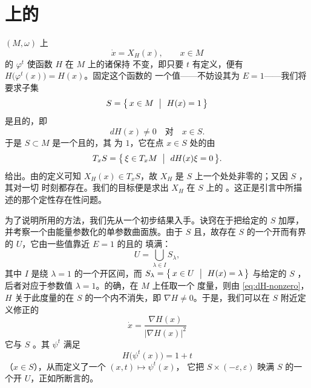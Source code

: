 
\section{\trEnergySurface{}上的\trPeriodicSolution}
\label{sec:energy-periodic-solutions}

$(M,\omega)$ 上\trHamiltonianVectorField%
\begin{equation}\label{eq:XH-xM}
\dot{x}=X_{H}(x),\qquad x\in M
\end{equation}
的\trFlow{} $\varphi^{t}$ 使\trSmooth{}函数 $H$ 在 $M$ 上的诸\trLevelSet{}保持%
不变，即只要 $t$ 有定义，便有 $H\bigl(\varphi^{t}(x)\bigr)=H(x)$。固定这个\trEnergy{}函数的%
一个值——不妨设其为 $E=1$——我们将要求子集
\begin{equation}\label{eq:S-level-one}
S=\bigl\{\,x\in M\ \bigm|\ H(x)=1\,\bigr\}
\end{equation}
是\trCompact{}且\trRegular{}的，即
\begin{equation}\label{eq:dH-nonzero}
dH(x)\neq0\quad\text{对}\quad x\in S.
\end{equation}
于是 $S\subset M$ 是一个\trSmooth{}且\trCompact{}的\trSubmanifold，其%
\trCodimension{}为 $1$，它在点 $x\in S$ 处的\trTangentSpace{}由
\begin{equation}\label{eq:tangent-space-S}
T_{x}S=\bigl\{\,\xi\in T_{x}M\ \bigm|\ dH(x)\xi=0\,\bigr\}.
\end{equation}
给出。由\trHamiltonianVectorField{}的定义可知 $X_{H}(x)\in T_{x}S$，故 $X_{H}$%
是 $S$ 上一个处处非零的\trVectorField；又因 $S$ \trCompact，其\trFlow{}对一切%
时刻都存在。我们的目标便是求出 $X_{H}$ 在\trEnergySurface{} $S$ 上的%
\trPeriodicSolution。这正是引言中所描述的那个定性存在性问题。

为了说明所用的方法，我们先从一个初步结果入手。诀窍在于把给定的%
\trEnergySurface{} $S$ 加厚，并考察一个由能量参数化的单参数曲面族。由于%
$S$ \trCompact{}且\trRegular，故存在 $S$ 的一个开而有界的\trNeighborhood{}%
$U$，它由一些\trEnergy{}值靠近 $E=1$ 的\trCompact{}且\trRegular{}的%
\trEnergySurface{}填满：
\begin{equation}\label{eq:U-union}
U=\bigcup_{\lambda\in I}S_{\lambda},
\end{equation}
其中 $I$ 是绕 $\lambda=1$ 的一个开区间，而%
$S_{\lambda}=\bigl\{\,x\in U\ \bigm|\ H(x)=\lambda\,\bigr\}$ 与给定的\trSurface{}%
$S$ \trDiffeomorphic，后者对应于参数值 $\lambda=1$。的确，在 $M$ 上任取一个%
\trRiemann{}度量，则由 \eqref{eq:dH-nonzero}，%
$H$ 关于此度量的\trGradient{}在 $S$ 的一个\trNeighborhood{}内不消失，即%
$\nabla H\neq0$。于是，我们可以在 $S$ 附近定义修正的\trGradient{}\trVectorField
\[
\dot{x}=\frac{\nabla H(x)}{\lvert\nabla H(x)\rvert^{2}}
\]
它与 $S$ \trTransversal。其\trFlow{} $\psi^{t}$ 满足
\[
H\bigl(\psi^{t}(x)\bigr)=1+t
\]
（$x\in S$），从而定义了一个\trDiffeomorphism{} $(x,t)\mapsto\psi^{t}(x)$，%
它把 $S\times(-\varepsilon,\varepsilon)$ 映满 $S$ 的一个开\trNeighborhood{}%
$U$，正如所断言的。

